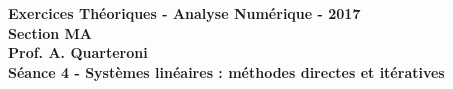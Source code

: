\begin{center}
  \textbf{Exercices Théoriques - Analyse Numérique - 2017 \\
  Section MA \\
  Prof. A. Quarteroni \\
  Séance 4 - Systèmes linéaires : méthodes directes et itératives}
\end{center}


\vspace{10mm}

\begin{ex}

\end{ex}

\begin{sol}

\end{sol}

\begin{ex}

\end{ex}

\begin{sol}

\end{sol}

\begin{ex}

\end{ex}

\begin{sol}

\end{sol}

\begin{ex}

\end{ex}

\begin{sol}

\end{sol}